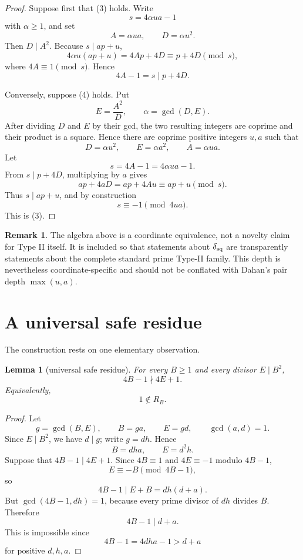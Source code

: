 \documentclass[11pt]{article}
\newtheorem{lemma}[theorem]{Lemma}
\theoremstyle{definition}
\newtheorem{remark}[theorem]{Remark}
\begin{document}
\begin{proof}
Suppose first that (3) holds.  Write
\[
s=4\alpha ua-1
\]
with $\alpha\ge1$, and set
\[
A=\alpha ua,
\qquad
D=\alpha u^2.
\]
Then $D\mid A^2$.  Because $s\mid ap+u$,
\[
4\alpha u(ap+u)=4Ap+4D\equiv p+4D\pmod{s},
\]
where $4A\equiv1\pmod{s}$.  Hence
\[
4A-1=s\mid p+4D.
\]

Conversely, suppose (4) holds.  Put
\[
E=\frac{A^2}{D},
\qquad
\alpha=\gcd(D,E).
\]
After dividing $D$ and $E$ by their gcd, the two resulting integers are coprime and their product is a square.  Hence there are coprime positive integers $u,a$ such that
\[
D=\alpha u^2,
\qquad
E=\alpha a^2,
\qquad
A=\alpha ua.
\]
Let
\[
s=4A-1=4\alpha ua-1.
\]
From $s\mid p+4D$, multiplying by $a$ gives
\[
ap+4aD=ap+4Au\equiv ap+u\pmod{s}.
\]
Thus $s\mid ap+u$, and by construction
\[
s\equiv-1\pmod{4ua}.
\]
This is (3).
\end{proof}

\begin{remark}
The algebra above is a coordinate equivalence, not a novelty claim for Type II itself.  It is included so that statements about $\delta_{\rm sq}$ are transparently statements about the complete standard prime Type-II family.  This depth is nevertheless coordinate-specific and should not be conflated with Dahan's pair depth $\max(u,a)$.
\end{remark}

\section{A universal safe residue}
The construction rests on one elementary observation.

\begin{lemma}[universal safe residue]
For every $B\ge1$ and every divisor $E\mid B^2$,
\[
4B-1\nmid4E+1.
\]
Equivalently,
\[
1\notin R_B.
\]
\end{lemma}

\begin{proof}
Let
\[
g=\gcd(B,E),\qquad B=ga,\qquad E=gd,\qquad\gcd(a,d)=1.
\]
Since $E\mid B^2$, we have $d\mid g$; write $g=dh$.  Hence
\[
B=dha,
\qquad
E=d^2h.
\]
Suppose that $4B-1\mid4E+1$.  Since $4B\equiv1$ and $4E\equiv-1$ modulo $4B-1$,
\[
E\equiv-B\pmod{4B-1},
\]
so
\[
4B-1\mid E+B=dh(d+a).
\]
But $\gcd(4B-1,dh)=1$, because every prime divisor of $dh$ divides $B$.  Therefore
\[
4B-1\mid d+a.
\]
This is impossible since
\[
4B-1=4dha-1>d+a
\]
for positive $d,h,a$.
\end{proof}
\end{document}
